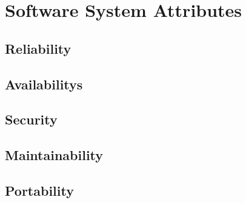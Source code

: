 \section{Software System Attributes}
\subsection{Reliability}
\subsection{Availabilitys}
\subsection{Security}
\subsection{Maintainability}
\subsection{Portability}
